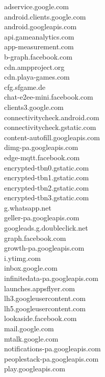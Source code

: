 \documentclass[12pt,a4paper]{article}
\begin{document}
        \begin{scriptsize}
            \begin{multicols}{3}
                \begin{center}
                        adservice.google.com\\android.clients.google.com\\android.googleapis.com\\
                        api.gameanalytics.com\\app-measurement.com\\b-graph.facebook.com\\cdn.ampproject.org\\
                        cdn.playa-games.com\\cfg.sfgame.de\\chat-e2ee-mini.facebook.com\\clients3.google.com\\
                        connectivitycheck.android.com\\connectivitycheck.gstatic.com\\content-autofill.googleapis.com\\
                        dimg-pa.googleapis.com\\edge-mqtt.facebook.com\\encrypted-tbn0.gstatic.com\\
                        encrypted-tbn1.gstatic.com\\encrypted-tbn2.gstatic.com\\encrypted-tbn3.gstatic.com\\g.whatsapp.net\\
                        geller-pa.googleapis.com\\googleads.g.doubleclick.net\\graph.facebook.com\\growth-pa.googleapis.com\\
                        i.ytimg.com\\inbox.google.com\\infinitedata-pa.googleapis.com\\launches.appsflyer.com\\
                        lh3.googleusercontent.com\\lh5.googleusercontent.com\\lookaside.facebook.com\\mail.google.com\\
                        mtalk.google.com\\notifications-pa.googleapis.com\\peoplestack-pa.googleapis.com\\play.googleapis.com\\

\end{center}
\end{multicols}
\end{scriptsize}
\end{document}
